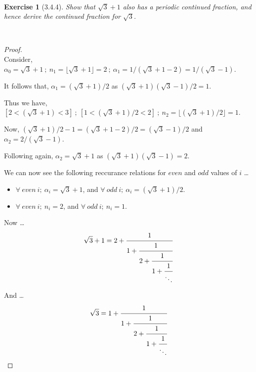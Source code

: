 \documentclass[12pt]{article}
\newcommand{\XB}{\color{black}}
\newcommand{\XBB}{\color{blue}}
\theoremstyle{plain}
\newtheorem{ex}{Exercise}
\begin{document}
\newpage

\XBB\hrulefill\XB \\
\begin{ex} [3.4.4]
  Show that $\sqrt{3}+1$ also has a periodic continued fraction, and hence derive the continued fraction for $\sqrt{3}$.
\end{ex}
\XBB\hrulefill\XB \\

\begin{proof}
  \ \\

  Consider, $ \alpha_{0} = \sqrt{3} + 1 \ ; \ n_{1} = \lfloor \sqrt{3} + 1 \rfloor = 2 \ ; \ \alpha_{1} = 1/(\sqrt{3} + 1 - 2) = 1/(\sqrt{3} - 1) $.

  It follows that, $ \alpha_{1} = (\sqrt{3} + 1)/2 $ as $ (\sqrt{3} + 1)(\sqrt{3} - 1)/2 = 1 $.

  Thus we have, $ [2 < (\sqrt{3} + 1) < 3] \ ; \ [1 < (\sqrt{3} + 1)/2 < 2] \ ; \ n_{2} = \lfloor (\sqrt{3} + 1)/2 \rfloor = 1 $.

  Now, $ (\sqrt{3} + 1)/2 - 1 = (\sqrt{3} + 1 - 2)/2 = (\sqrt{3} - 1)/2 $ and $ \alpha_{2} = 2/(\sqrt{3} - 1) $.

  Following again, $ \alpha_{2} = \sqrt{3} + 1 $ as $ (\sqrt{3} + 1)(\sqrt{3} - 1) = 2 $.

  We can now see the following reccurance relations for $even$ and $odd$ values of $ i $ \dots

  \begin{itemize}
    \item $ \forall \ even \ i ; \ \alpha_{i} = \sqrt{3} + 1 $, and $ \forall \ odd \ i ; \ \alpha_{i} = (\sqrt{3} + 1)/2 $.
    \item $ \forall \ even \ i ; \ n_{i} = 2 $, and $ \forall \ odd \ i ; \ n_{i} = 1 $.
  \end{itemize}
  
  Now \dots
  \[
    \sqrt{3} + 1 = 2 + \cfrac{1}{1 + \cfrac{1}{2 + \cfrac{1}{1 + \cfrac{1}{\ddots}}}}
  \]

  And \dots
  \[
    \sqrt{3} = 1 + \cfrac{1}{1 + \cfrac{1}{2 + \cfrac{1}{1 + \cfrac{1}{\ddots}}}}
  \]
\end{proof}
\end{document}
